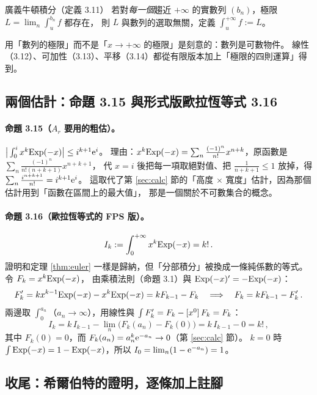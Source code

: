 \begin{prereq}{廣義牛頓積分（定義 3.11）}
若對\emph{每一個}趨近 $+\infty$ 的實數列 $(b_n)$，極限 $L=\lim_n\int_u^{b_n}f$ 都存在，
則 $L$ 與數列的選取無關，定義 $\int_u^{+\infty}f:=L$。
\end{prereq}
用「數列的極限」而不是「$x\to+\infty$ 的極限」是刻意的：數列是可數物件。
線性（3.12）、可加性（3.13）、平移（3.14）都從有限版本加上「極限的四則運算」得到。

\subsection{兩個估計：命題 3.15 與形式版歐拉恆等式 3.16}

\paragraph{命題 3.15（$A_r$ 要用的粗估）。}
$\big|\int_0^{i}x^k\mathrm{Exp}(-x)\big|\le i^{k+1}\mathrm{e}^{i}$。
理由：$x^k\mathrm{Exp}(-x)=\sum_n\frac{(-1)^n}{n!}x^{n+k}$，原函數是 $\sum_n\frac{(-1)^n}{n!(n+k+1)}x^{n+k+1}$，
代 $x=i$ 後把每一項取絕對值、把 $\frac1{n+k+1}\le1$ 放掉，得 $\sum_n\frac{i^{n+k+1}}{n!}=i^{k+1}\mathrm{e}^{i}$。
這取代了第 \ref{sec:calc} 節的「高度 $\times$ 寬度」估計，因為那個估計用到「函數在區間上的最大值」，
那是一個關於不可數集合的概念。

\paragraph{命題 3.16（歐拉恆等式的 FPS 版）。}
\[
  I_k:=\int_0^{+\infty}x^k\mathrm{Exp}(-x)=k!\,.
\]
證明和定理 \ref{thm:euler} 一樣是歸納，但「分部積分」被換成一條純係數的等式。令 $F_k=x^k\mathrm{Exp}(-x)$，
由乘積法則（命題 3.1）與 $\mathrm{Exp}(-x)'=-\mathrm{Exp}(-x)$：
\[
  F_k'=kx^{k-1}\mathrm{Exp}(-x)-x^{k}\mathrm{Exp}(-x)=kF_{k-1}-F_k\quad\Longrightarrow\quad F_k=kF_{k-1}-F_k'\,.
\]
兩邊取 $\int_0^{a_n}$（$a_n\to\infty$），用線性與 $\int F_k'=F_k-[x^{0}]\,F_k=F_k$：
\[
  I_k=k\,I_{k-1}-\lim_{n}\big(F_k(a_n)-F_k(0)\big)=k\,I_{k-1}-0=k!\,,
\]
其中 $F_k(0)=0$，而 $F_k(a_n)=a_n^{k}\mathrm{e}^{-a_n}\to0$（第 \ref{sec:calc} 節）。
$k=0$ 時 $\int\mathrm{Exp}(-x)=1-\mathrm{Exp}(-x)$，所以 $I_0=\lim_n(1-\mathrm{e}^{-a_n})=1$。

\subsection{收尾：希爾伯特的證明，逐條加上註腳}

